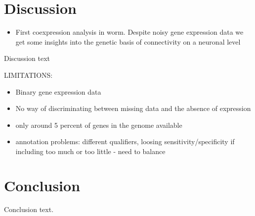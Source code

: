 \documentclass[10pt,letterpaper]{article}
\begin{document}
%
%
%
%
%

\section*{Discussion}
\begin{itemize}
    \item{First coexpression analysis in worm. Despite noisy gene expression data we get some insights into the genetic basis of connectivity on a neuronal level}
\end{itemize}
Discussion text


LIMITATIONS:
\begin{itemize}
    \item{Binary gene expression data}
    \item{No way of discriminating between missing data and the absence of expression}
    \item{only around 5 percent of genes in the genome available}
    \item{annotation problems: different qualifiers, loosing sensitivity/specificity if including too much or too little - need to balance}

\end{itemize}

\section*{Conclusion}

Conclusion text.
\end{document}
